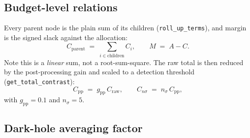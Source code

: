 %
%
%
%

\subsection{Budget-level relations}

Every parent node is the plain sum of its children (\texttt{roll\_up\_terms}),
and margin is the signed slack against the allocation:
%
\begin{equation}
  C_{\mathrm{parent}} \;=\; \sum_{i \in \mathrm{children}} C_i ,
  \qquad
  M \;=\; A - C .
  \label{eq:rollup}
\end{equation}
%
Note this is a \emph{linear} sum, not a root-sum-square. The raw total is then
reduced by the post-processing gain and scaled to a detection threshold
(\texttt{get\_total\_contrast}):
%
\begin{equation}
  C_{\mathrm{pp}} \;=\; g_{\mathrm{pp}}\, C_{\mathrm{raw}} ,
  \qquad
  C_{n\sigma} \;=\; n_\sigma\, C_{\mathrm{pp}} ,
  \label{eq:postproc}
\end{equation}
%
with $g_{\mathrm{pp}} = 0.1$ and $n_\sigma = 5$.

\subsection{Dark-hole averaging factor}

